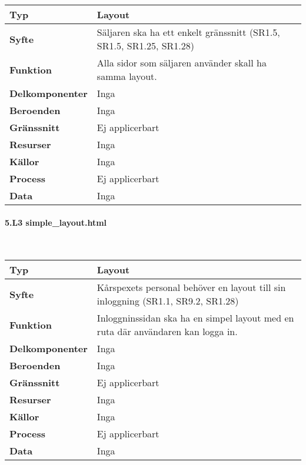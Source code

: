 \documentclass[a4paper, twoside, 11pt, titlepage]{article}
\begin{document}
			\begin {table} [ht] \begin{tabular} {  p{3.5cm} p{11.6cm} }
				\hline
				{\sffamily\textbf{Typ}} & {Layout} \\
				\hline
				{\sffamily\textbf{Syfte}} & {Säljaren ska ha ett enkelt gränssnitt (SR1.5, SR1.5, SR1.25, SR1.28)} \\
				\hline
				{\sffamily\textbf{Funktion}} & {Alla sidor som säljaren använder skall ha samma layout.} \\
				\hline
				{\sffamily\textbf{Delkomponenter}} & {Inga} \\
				\hline
				{\sffamily\textbf{Beroenden}} & {Inga} \\
				\hline
				{\sffamily\textbf{Gränssnitt}} & {Ej applicerbart} \\
				\hline
				{\sffamily\textbf{Resurser}} & {Inga} \\
				\hline
				{\sffamily\textbf{Källor}} & {Inga} \\
				\hline
				{\sffamily\textbf{Process}} & {Ej applicerbart} \\
				\hline
				{\sffamily\textbf{Data}} & {Inga} \\
				\hline
			\end{tabular} \end{table} \FloatBarrier


			\clearpage %
			\paragraph{5.L3 simple\_layout.html}\

			\begin {table} [ht] \begin{tabular} {  p{3.5cm} p{11.6cm} }
				\hline
				{\sffamily\textbf{Typ}} & {Layout} \\
				\hline
				{\sffamily\textbf{Syfte}} & {Kårspexets personal behöver en layout till sin inloggning (SR1.1, SR9.2, SR1.28)} \\
				\hline
				{\sffamily\textbf{Funktion}} & {Inloggninssidan ska ha en simpel layout med en ruta där användaren kan logga in.} \\
				\hline
				{\sffamily\textbf{Delkomponenter}} & {Inga} \\
				\hline
				{\sffamily\textbf{Beroenden}} & {Inga} \\
				\hline
				{\sffamily\textbf{Gränssnitt}} & {Ej applicerbart} \\
				\hline
				{\sffamily\textbf{Resurser}} & {Inga} \\
				\hline
				{\sffamily\textbf{Källor}} & {Inga} \\
				\hline
				{\sffamily\textbf{Process}} & {Ej applicerbart} \\
				\hline
				{\sffamily\textbf{Data}} & {Inga} \\
				\hline
			\end{tabular} \end{table} \FloatBarrier
\end{document}
